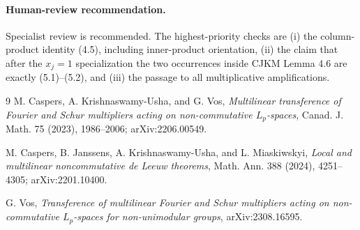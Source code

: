 \documentclass[11pt]{article}
\begin{document}
\paragraph{Human-review recommendation.}
Specialist review is recommended.  The highest-priority checks are (i) the
column-product identity (4.5), including inner-product orientation, (ii) the
claim that after the \(x_j=1\) specialization the two occurrences inside CJKM
Lemma 4.6 are exactly (5.1)--(5.2), and (iii) the passage to all multiplicative
amplifications.

\begin{thebibliography}{9}
M. Caspers, A. Krishnaswamy-Usha, and G. Vos,
\emph{Multilinear transference of Fourier and Schur multipliers acting on
non-commutative \(L_p\)-spaces}, Canad. J. Math. 75 (2023), 1986--2006;
arXiv:2206.00549.

M. Caspers, B. Janssens, A. Krishnaswamy-Usha, and L. Miaskiwskyi,
\emph{Local and multilinear noncommutative de Leeuw theorems},
Math. Ann. 388 (2024), 4251--4305; arXiv:2201.10400.

G. Vos,
\emph{Transference of multilinear Fourier and Schur multipliers acting on
non-commutative \(L_p\)-spaces for non-unimodular groups},
arXiv:2308.16595.
\end{thebibliography}
\end{document}
